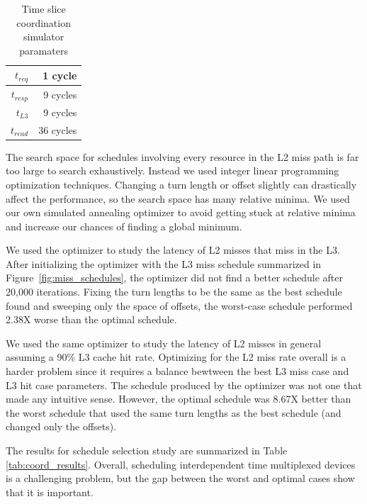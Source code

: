 \begin{table}
    \caption{Time slice coordination simulator paramaters}
    \centering
    \begin{tabular}{|r|r|}
        \hline
        $t_{req}$  &   1 cycle \\\hline
        $t_{resp}$ & 9 cycles \\\hline
        $t_{L3}$   &   9 cycles \\\hline
        $t_{read}$ & 36 cycles \\\hline
    \end{tabular}
    \label{tab:l2_miss_schedules}
\end{table}

The search space for schedules involving every resource in the L2 miss path
is far too large to search exhaustively.
Instead we used integer linear programming optimization 
techniques. Changing a turn length or offset slightly can drastically affect 
the performance, so the search space has many relative minima. We used 
our own simulated annealing optimizer to avoid getting stuck at relative minima 
and increase our chances of finding a global minimum.

We used the optimizer to 
study the latency of L2 misses that miss in the L3.
After initializing the optimizer with the L3 miss schedule summarized in 
Figure~\ref{fig:miss_schedules}, the optimizer did not find a 
better schedule after 20,000 iterations. Fixing the turn lengths to be the same 
as the best schedule found and sweeping only the space of offsets,
the worst-case schedule performed 2.38X
worse than the optimal schedule.

We used the same optimizer to study the latency of L2 misses in general 
assuming a 90\% L3 cache hit rate.
Optimizing for the L2 miss rate overall is a harder problem since it requires a balance 
bewtween the best L3 miss case and L3 hit case parameters. The 
schedule produced by the optimizer was not one that made any intuitive sense. 
However, the optimal schedule was 8.67X better than the worst schedule that 
used the same turn lengths as the best schedule (and changed only the offsets).

The results for schedule selection study are summarized in Table 
\ref{tab:coord_results}. Overall, scheduling 
interdependent time multiplexed devices is a challenging problem, but the gap 
between the worst and optimal cases show that it is important.

